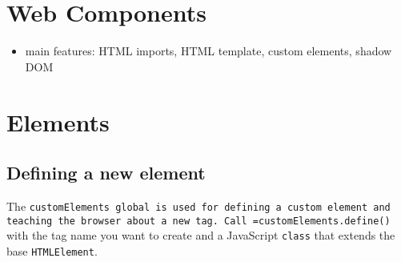 \documentclass[11pt]{article}
\author{eo shiru}
\date{\today}
\title{}
\begin{document}
\tableofcontents


\section{Web Components}
\label{sec:orgf7e4f95}
\begin{itemize}
\item main features: HTML imports, HTML template, custom elements, shadow DOM
\end{itemize}

\section{Elements}
\label{sec:org01bf604}
\subsection{Defining a new element}
\label{sec:orgf70d54a}
The \texttt{customElements global is used for defining a custom element and teaching the browser about a new tag. Call =customElements.define()} with the tag name you want to create and a JavaScript \texttt{class} that extends the base \texttt{HTMLElement}.
\end{document}
